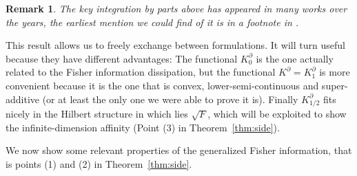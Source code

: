 \documentclass[11pt,a4paper]{article}
\theoremstyle{definition}
\theoremstyle{plain}
\newtheorem{remark}[defi]{Remark}
\begin{document}
\begin{remark}
    The key integration by parts above has appeared in many works over the years, the earliest mention we could find of it is in a footnote in \cite{Mckean1963}.
\end{remark}
This result allows us to freely exchange between formulations. It will turn useful because they have different advantages: The functional $K_0^\partial$ is the one actually related to the Fisher information dissipation, but the functional $K^\partial=K_1^\partial$ is more convenient because it is the one that is convex, lower-semi-continuous and super-additive (or at least the only one we were able to prove it is). Finally $K^\partial_{1/2}$ fits nicely in the Hilbert structure in which lies $\sqrt{F}$, which will be exploited to show the infinite-dimension affinity (Point (3) in Theorem~\ref{thm:side}).

We now show some relevant properties of the generalized Fisher information, that is points (1) and (2) in Theorem~\ref{thm:side}.
\end{document}
